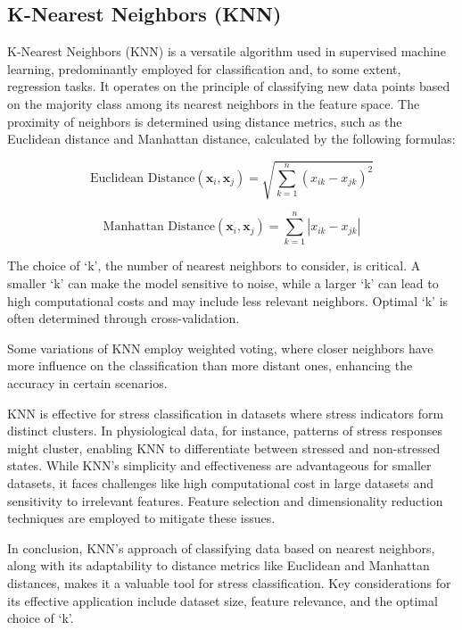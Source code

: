     \subsection*{K-Nearest Neighbors (KNN)}
    K-Nearest Neighbors (KNN) is a versatile algorithm used in supervised machine learning, predominantly employed for classification and, to some extent, regression tasks. It operates on the principle of classifying new data points based on the majority class among its nearest neighbors in the feature space. The proximity of neighbors is determined using distance metrics, such as the Euclidean distance and Manhattan distance, calculated by the following formulas:

    \begin{equation}
        \text{Euclidean Distance}(\mathbf{x}_i, \mathbf{x}_j) = \sqrt{\sum_{k=1}^{n} (x_{ik} - x_{jk})^2}
    \end{equation}
    
    \begin{equation}
        \text{Manhattan Distance}(\mathbf{x}_i, \mathbf{x}_j) = \sum_{k=1}^{n} |x_{ik} - x_{jk}|
    \end{equation}
    
    The choice of `k', the number of nearest neighbors to consider, is critical. A smaller `k' can make the model sensitive to noise, while a larger `k' can lead to high computational costs and may include less relevant neighbors. Optimal `k' is often determined through cross-validation.
    
    Some variations of KNN employ weighted voting, where closer neighbors have more influence on the classification than more distant ones, enhancing the accuracy in certain scenarios.
    
    KNN is effective for stress classification in datasets where stress indicators form distinct clusters. In physiological data, for instance, patterns of stress responses might cluster, enabling KNN to differentiate between stressed and non-stressed states. While KNN's simplicity and effectiveness are advantageous for smaller datasets, it faces challenges like high computational cost in large datasets and sensitivity to irrelevant features. Feature selection and dimensionality reduction techniques are employed to mitigate these issues.
    
    In conclusion, KNN's approach of classifying data based on nearest neighbors, along with its adaptability to distance metrics like Euclidean and Manhattan distances, makes it a valuable tool for stress classification. Key considerations for its effective application include dataset size, feature relevance, and the optimal choice of `k'.
    
